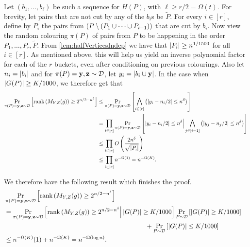 Let $(b_1,\ldots,b_\ell)$ be such a sequence for $H(P)$, with $\ell \geq r/2 = \Omega(t)$. For brevity, let pairs that are not cut by any of the $b_i$s be $\tilde{P}$. For every $i \in [r]$, define by $P_i$ the pairs from $\left( P \setminus \left( P_1 \cup \cdots \cup P_{i-1}\right) \right)$ that are cut by $b_i$. Now view the random colouring $\pi(P)$ of pairs from $P$ to be happening in the order $P_1,\ldots,P_r,\tilde{P}$. From \autoref{lem:halfVerticesIndep} we have that $\left|P_i\right| \geq n^{1/1500}$ for all $i \in [r]$. As mentioned above, this will help us yield an inverse polynomial factor for each of the $r$ buckets, even after conditioning on previous colourings. Also let $n_i = \left|b_i\right|$ and for $\pi(P)=\mathbf{y},\mathbf{z} \sim \mathcal{D}$, let $y_i = \left|b_i \cup \mathbf{y}\right|$. In the case when $\left|G(P)\right| \geq K/1000$, we therefore get that
\begin{align*}
\Pr_{\pi(P)=\mathbf{y},\mathbf{z} \sim \mathcal{D}} \left[\operatorname{rank}\left(M_{Y,Z}(g)\right) \geq 2^{n/2 - n^{\delta}}\right] &\leq \Pr_{\pi(P)=\mathbf{y},\mathbf{z} \sim \mathcal{D}} \left[\bigwedge_{i \in [r]} \left(\left|y_i - n_i/2\right| \leq n^{\delta}\right)\right]\\
&= \prod_{i \in [r]} \Pr_{\pi(P)=\mathbf{y},\mathbf{z} \sim \mathcal{D}} \left[ \left|y_i - n_i/2\right| \leq n^{\delta} \Big{|} \bigwedge_{j \in [i-1]} \left(\left|y_j - n_j/2\right| \leq n^{\delta}\right) \right]\\
&\leq \prod_{i \in [r]} O\left(\frac{2n^{\delta}}{\sqrt{\left|P_i\right|}}\right)\\
&\leq \prod_{i \in [r]} n^{-\Omega(1)} = n^{-\Omega(K)}.
\end{align*}

We therefore have the following result which finishes the proof.
\begin{align*}
&\Pr_{\pi(P)=\mathbf{y},\mathbf{z} \sim \mathcal{D}} \left[\operatorname{rank}\left(M_{Y,Z}(g)\right) \geq 2^{n/2 - n^{\delta}}\right] &\\
&= \Pr_{\pi(P)=\mathbf{y},\mathbf{z} \sim \mathcal{D}} \left[\operatorname{rank}\left(M_{Y,Z}(g)\right) \geq 2^{n/2 - n^{\delta}} \Big{|} \left|G(P)\right| \geq K/1000\right] \Pr_{P \sim \mathcal{D}} \left[\left|G(P)\right| \geq K/1000\right]\\
& \qquad \qquad \qquad \qquad \qquad \qquad \qquad \qquad \qquad \qquad \qquad + \Pr_{P \sim \mathcal{D}} \left[\left|G(P)\right| \leq K/1000\right]\\
&\leq n^{-\Omega(K)} (1) + n^{-\Omega(K)} = n^{-\Omega(\log n)}.\\
\end{align*}


